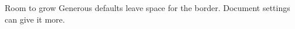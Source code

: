 \documentclass{beamer}
\begin{document}
\begin{frame}{Room to grow}
  Generous defaults leave space for the border. Document settings can give it more.
\end{frame}
\end{document}
